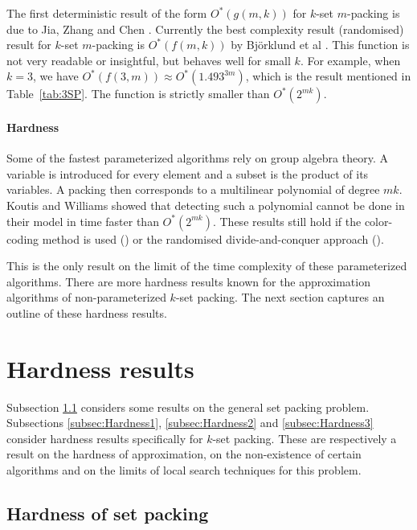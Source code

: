 The first deterministic result of the form $O^*(g(m,k))$ for $k$-set $m$-packing is due to Jia, Zhang and Chen \cite{5.7kk}. Currently the best complexity result (randomised) result for $k$-set $m$-packing is $O^*(f(m,k))$ by Bj\"{o}rklund et al \cite{Bjorklund}. This function is not very readable or insightful, but behaves well for small $k$. For example, when $k=3$, we have $O^*(f(3,m)) \approx O^*(1.493^{3m})$, which is the result mentioned in Table~\ref{tab:3SP}. %
The function is %
strictly smaller than $O^*(2^{mk})$.%

\paragraph{Hardness} Some of the fastest parameterized algorithms rely on group algebra theory. %
A variable is introduced for every element and a subset is the product of its variables. A packing then corresponds to a multilinear polynomial of degree $mk$. Koutis and Williams \cite{KoutisWilliams} showed that detecting such a polynomial cannot be done in their model in time faster than $O^*(2^{mk})$. These results still hold if the color-coding method is used (\cite{ColorCoding}) or the randomised divide-and-conquer approach (\cite{DivideAndConquer,SmallColorCoding}).

This is the only result on the limit of the time complexity of these parameterized algorithms. There are more hardness results known for the approximation algorithms of non-parameterized $k$-set packing. The next section captures an outline of these hardness results.

\section{Hardness results}\label{sec:Hardness}

Subsection \ref{subsec:Hardness0} considers some results on the general set packing problem. Subsections \ref{subsec:Hardness1}, \ref{subsec:Hardness2} and \ref{subsec:Hardness3} consider hardness results specifically for $k$-set packing. These are respectively a result on the hardness of approximation, on the non-existence of certain algorithms and on the limits of local search techniques for this problem.

\subsection{Hardness of set packing}\label{subsec:Hardness0}

